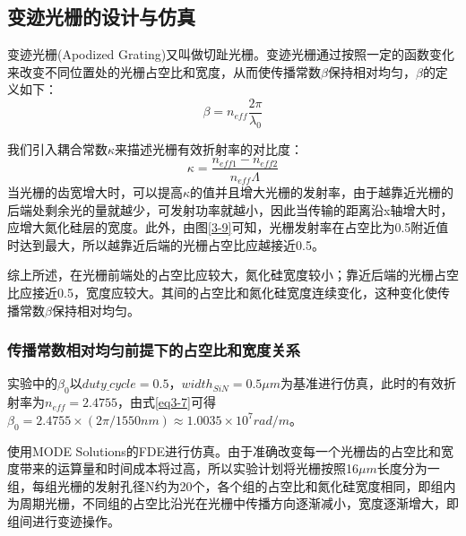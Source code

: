 \documentclass[UTF8,a4paper,12pt]{ctexart}
\numberwithin{equation}{section}
\begin{document}
\subsection{变迹光栅的设计与仿真}
变迹光栅(Apodized Grating)又叫做切趾光栅。变迹光栅通过按照一定的函数变化来改变不同位置处的光栅占空比和宽度，从而使传播常数$\beta$保持相对均匀，$\beta$的定义如下：
\begin{equation}
    \beta = n_{eff}\frac{2\pi}{\lambda_0}
    \label{eq3-7}
\end{equation}

我们引入耦合常数$\kappa$来描述光栅有效折射率的对比度：
\begin{equation}
    \kappa = \frac{n_{eff1}-n_{eff2}}{n_{eff}\Lambda}
    \label{eq3-8}
\end{equation}
当光栅的齿宽增大时，可以提高$\kappa$的值并且增大光栅的发射率，由于越靠近光栅的后端处剩余光的量就越少，可发射功率就越小，因此当传输的距离沿x轴增大时，应增大氮化硅层的宽度。此外，由图\ref{3-9}可知，光栅发射率在占空比为0.5附近值时达到最大，所以越靠近后端的光栅占空比应越接近0.5。

综上所述，在光栅前端处的占空比应较大，氮化硅宽度较小；靠近后端的光栅占空比应接近0.5，宽度应较大。其间的占空比和氮化硅宽度连续变化，这种变化使传播常数$\beta$保持相对均匀。
\subsubsection{传播常数相对均匀前提下的占空比和宽度关系}
\label{sec3-4-1}
实验中的$\beta_0$以$duty\underline{~} cycle =0.5$，$width_{SiN}=0.5\mu m$为基准进行仿真，此时的有效折射率为$n_{eff} = 2.4755$，由式\ref{eq3-7}可得$\beta_0 = 2.4755\times (2\pi/1550nm)\approx 1.0035\times 10^7rad/m$。

使用MODE Solutions的FDE进行仿真。由于准确改变每一个光栅齿的占空比和宽度带来的运算量和时间成本将过高，所以实验计划将光栅按照16$\mu m$长度分为一组，每组光栅的发射孔径N约为20个，各个组的占空比和氮化硅宽度相同，即组内为周期光栅，不同组的占空比沿光在光栅中传播方向逐渐减小，宽度逐渐增大，即组间进行变迹操作。
\end{document}
